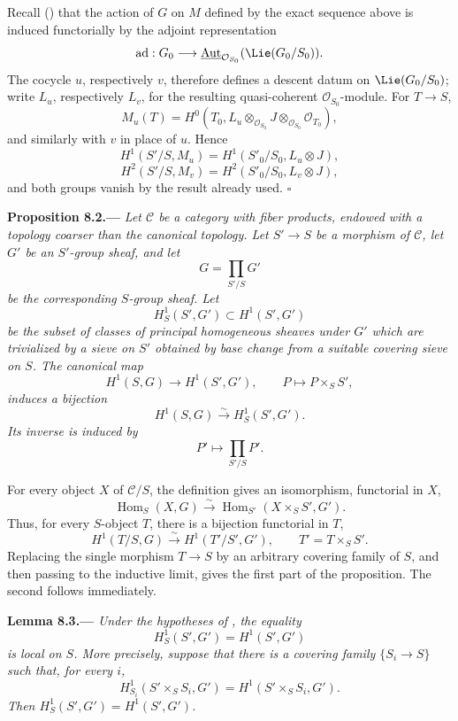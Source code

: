 Recall () that the action of \(G\) on \(M\) defined by
the exact sequence above is induced functorially by the adjoint
representation
\[
  \operatorname{ad}:G_0
  \longrightarrow
  \underline{\operatorname{Aut}}_{\mathcal O_{S_0}}
    (\Lie(G_0/S_0)).
\]
The cocycle \(u\), respectively \(v\), therefore defines a descent
datum on \(\Lie(G_0/S_0)\); write \(L_u\), respectively \(L_v\), for
the resulting quasi-coherent \(\mathcal O_{S_0}\)-module. For
\(T\to S\),
\[
  M_u(T)
  =
  H^0\!\left(
    T_0,
    L_u\otimes_{\mathcal O_{S_0}}J
      \otimes_{\mathcal O_{S_0}}\mathcal O_{T_0}
  \right),
\]
and similarly with \(v\) in place of \(u\). Hence
\[
  H^1(S'/S,M_u)=H^1(S'_0/S_0,L_u\otimes J),
\]
\[
  H^2(S'/S,M_v)=H^2(S'_0/S_0,L_v\otimes J),
\]
and both groups vanish by the result already used.
\hfill\(\square\)

\par\medskip\noindent{}\textbf{Proposition 8.2.---}\enspace
\emph{Let \(\mathcal C\) be a category with fiber products, endowed
with a topology coarser than the canonical topology. Let \(S'\to S\)
be a morphism of \(\mathcal C\), let \(G'\) be an \(S'\)-group sheaf,
and let
\[
  G=\prod_{S'/S}G'
\]
be the corresponding \(S\)-group sheaf. Let
\[
  H^1_S(S',G')\subset H^1(S',G')
\]
be the subset of classes of principal homogeneous sheaves under
\(G'\) which are trivialized by a sieve on \(S'\) obtained by base
change from a suitable covering sieve on \(S\). The canonical map
\[
  H^1(S,G)\longrightarrow H^1(S',G'),
  \qquad
  P\longmapsto P\times_SS',
\]
induces a bijection
\[
  H^1(S,G)\xrightarrow{\sim}H^1_S(S',G').
\]
Its inverse is induced by
\[
  P'\longmapsto\prod_{S'/S}P'.
\]}

For every object \(X\) of \(\mathcal C/S\), the definition gives an
isomorphism, functorial in \(X\),
\[
  \operatorname{Hom}_S(X,G)
  \xrightarrow{\sim}
  \operatorname{Hom}_{S'}(X\times_SS',G').
\]
Thus, for every \(S\)-object \(T\), there is a bijection functorial in
\(T\),
\[
  H^1(T/S,G)
  \xrightarrow{\sim}
  H^1(T'/S',G'),
  \qquad
  T'=T\times_SS'.
\]
Replacing the single morphism \(T\to S\) by an arbitrary covering
family of \(S\), and then passing to the inductive limit, gives the
first part of the proposition. The second follows immediately.

\par\medskip\noindent{}\textbf{Lemma 8.3.---}\enspace
\emph{Under the hypotheses of , the equality
\[
  H^1_S(S',G')=H^1(S',G')
\]
is local on \(S\). More precisely, suppose that there is a covering
family \(\{S_i\to S\}\) such that, for every \(i\),
\[
  H^1_{S_i}(S'\times_SS_i,G')
  =
  H^1(S'\times_SS_i,G').
\]
Then \(H^1_S(S',G')=H^1(S',G')\).}

